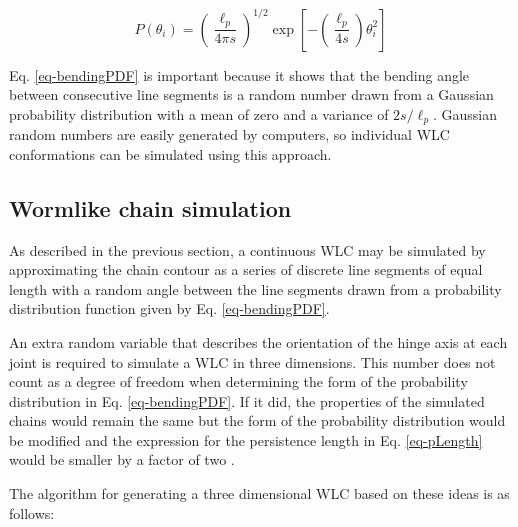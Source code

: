 \documentclass[12pt, a4paper]{article}
\begin{document}
\begin{equation}
  \label{eq-bendingPDF}
  P \left( \theta_i \right) = \left( \frac{\ell_p}{4 \pi s} \right)^{1/2} \exp \left[ -\left( \frac{\ell_p}{4 s} \right) \theta_i^2 \right]
\end{equation}

Eq. \eqref{eq-bendingPDF} is important because it shows that the
bending angle between consecutive line segments is a random number
drawn from a Gaussian probability distribution with a mean of zero
and a variance of $2s / \ell_p$. Gaussian random numbers are
easily generated by computers, so individual WLC conformations can
be simulated using this approach.

\subsection{Wormlike chain simulation}
\label{sec-2-2}
\label{sec-WLCSimulation}
As described in the previous section, a continuous WLC may be
simulated by approximating the chain contour as a series of
discrete line segments of equal length with a random angle between
the line segments drawn from a probability distribution function
given by Eq. \eqref{eq-bendingPDF}.

An extra random variable that describes the orientation of the
hinge axis at each joint is required to simulate a WLC in three
dimensions. This number does not count as a degree of freedom when
determining the form of the probability distribution in
Eq. \eqref{eq-bendingPDF}. If it did, the properties of the
simulated chains would remain the same but the form of the
probability distribution would be modified and the expression for
the persistence length in Eq. \eqref{eq-pLength} would be smaller
by a factor of two \cite{schellman-biopolymers-1974}.

The algorithm for generating a three dimensional WLC based on
these ideas is as follows:
\end{document}
